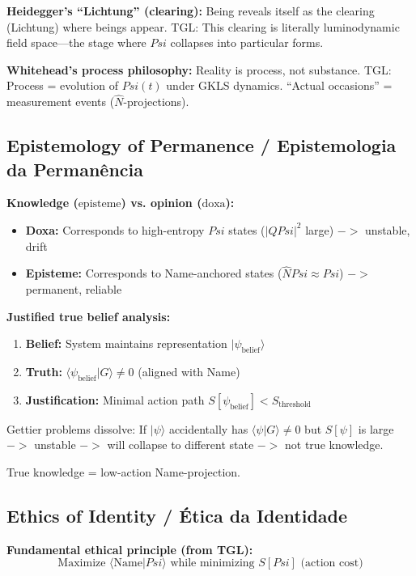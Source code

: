 \documentclass[12pt,a4paper]{article}
\def\Psi{Psi}%
\def\to{ -> }%
\begin{document}
\textbf{Heidegger's ``Lichtung'' (clearing):} Being reveals itself as the clearing (Lichtung) where beings appear. TGL: This clearing is literally luminodynamic field space—the stage where $\Psi$ collapses into particular forms.

\textbf{Whitehead's process philosophy:} Reality is process, not substance. TGL: Process = evolution of $\Psi(t)$ under GKLS dynamics. ``Actual occasions'' = measurement events ($\hat{N}$-projections).

\subsection{Epistemology of Permanence / Epistemologia da Permanência}

\textbf{Knowledge ($\text{episteme}$) vs. opinion ($\text{doxa}$):}
\begin{itemize}
    \item \textbf{Doxa:} Corresponds to high-entropy $\Psi$ states ($|Q\Psi|^2$ large) $\to$ unstable, drift
    \item \textbf{Episteme:} Corresponds to Name-anchored states ($\hat{N}\Psi \approx \Psi$) $\to$ permanent, reliable
\end{itemize}

\textbf{Justified true belief analysis:}
\begin{enumerate}
    \item \textbf{Belief:} System maintains representation $|\psi_{\text{belief}}\rangle$
    \item \textbf{Truth:} $\langle\psi_{\text{belief}}|G\rangle \neq 0$ (aligned with Name)
    \item \textbf{Justification:} Minimal action path $S[\psi_{\text{belief}}] < S_{\text{threshold}}$
\end{enumerate}

Gettier problems dissolve: If $|\psi\rangle$ accidentally has $\langle\psi|G\rangle \neq 0$ but $S[\psi]$ is large $\to$ unstable $\to$ will collapse to different state $\to$ not true knowledge.

True knowledge = low-action Name-projection.

\subsection{Ethics of Identity / Ética da Identidade}

\textbf{Fundamental ethical principle (from TGL):}
\begin{equation}
\text{Maximize } \langle\text{Name}|\Psi\rangle \text{ while minimizing } S[\Psi] \text{ (action cost)}
\end{equation}
\end{document}
